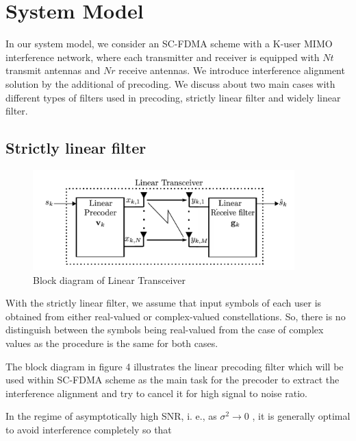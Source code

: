 \documentclass[12pt,a4paper,notitlepage,twoside,headsepline]{scrartcl}
\begin{document}
\section{System Model}

In our system model, we consider an SC-FDMA scheme with a K-user MIMO interference network, where each transmitter and receiver is equipped with $Nt$ transmit antennas and $Nr$ receive antennas. We introduce interference alignment solution by the additional of precoding. We discuss about two main cases with different types of filters used in precoding, strictly linear filter and widely linear filter. 

\subsection{Strictly linear filter}

\begin{figure}[!ht]
\begin{center}
\includegraphics[width=0.9\textwidth]{figures/sl_system_model.png}
\end{center}
\caption{Block diagram of Linear Transceiver} 
\label{fig:example}
\end{figure}

With the strictly linear filter, we assume that input symbols of each user is obtained from either real-valued or complex-valued constellations. So, there is no distinguish between the symbols being real-valued from the case of complex values as the procedure is the same for both cases. 

The block diagram in figure 4 illustrates the linear precoding filter which will be used within SC-FDMA scheme as the main task for the precoder to extract the interference alignment and try to cancel it for high signal to noise ratio.

In the regime of asymptotically high SNR, i. e., as $\sigma^2 \rightarrow 0$ ,
it is generally optimal to avoid interference completely so that
\end{document}
